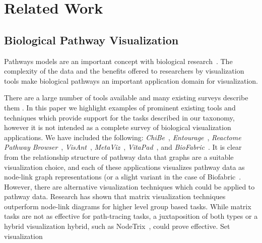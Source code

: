 \documentclass[journal]{vgtc}                %
\begin{document}
\section{Related Work}
\subsection{Biological Pathway Visualization}


Pathways models are an important concept with biological research~\cite{cairns2011regulation, luo2003targeting,reya2001stem}.
The complexity of the data and the benefits offered to researchers by visualization tools make biological pathways an important application domain for visualization.


There are a large number of tools available and many existing surveys describe them \cite{Suderman2007tools,pavlopoulos2008survey,Gehlenborg2010omics}.
In this paper we highlight examples of prominent existing tools and techniques which provide support for the tasks described in our taxonomy, however it is not intended as a complete survey of biological visualization applications.
We have included the following: \textit{ChiBe}~\cite{Babur2010chibe}, \textit{Entourage}~\cite{Lex2013entourage}, \textit{Reactome Pathway Browser}~\cite{croft2014reactome}, \textit{VisAnt}~\cite{hu2004visant}, \textit{MetaViz}~\cite{bourqui2007metabolic}, \textit{VitaPad}~\cite{holford2005vitapad}, and \textit{BioFabric}~\cite{Longabaugh2012biofabric}.
It is clear from the relationship structure of pathway data that graphs are a suitable visualization choice, and each of these applications visualizes pathway data as node-link graph representations (or a slight variant in the case of Biofabric~\cite{Longabaugh2012biofabric}.
However, there are alternative visualization techniques which could be applied to pathway data.
Research has shown that matrix visualization techniques outperform node-link diagrams for higher level group based tasks\cite{Ghoniem2004,Henry2007}.
While matrix tasks are not as effective for path-tracing tasks, a juxtaposition of both types or a hybrid visualization hybrid, such as NodeTrix~\cite{NodeTrix2007}, could prove effective.
Set visualization
\end{document}
